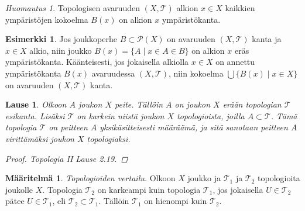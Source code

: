 \documentclass[12pt,a4paper,leqno]{report}
\newcommand{\T}{\mathcal{T}}
\newcommand{\Pot}{\mathcal{P}}
\theoremstyle{plain}
\newtheorem{lause}[equation]{Lause}
\theoremstyle{definition}
\newtheorem{maar}[equation]{Määritelmä}
\newtheorem{esim}[equation]{Esimerkki}
\theoremstyle{remark}
\newtheorem{huom}[equation]{Huomautus}
\begin{document}
\begin{huom}\label{kaikki_ystöt}
Topologisen avaruuden $(X,\T)$ alkion $x\in X$ kaikkien ympäristöjen kokoelma $B(x)$ on alkion $x$ ympäristökanta.
\end{huom}
\begin{esim}
Jos joukkoperhe $B\subset\Pot(X)$ on avaruuden $(X,\T)$ kanta ja 
$x\in X$ alkio, niin joukko 
$B(x)=\{A\mid x\in A\in B\}$ on alkion $x$ eräs ympäristökanta.
Käänteisesti, jos jokaisella alkiolla $x\in X$ on annettu ympäristökanta 
$B(x)$ avaruudessa $(X,\T)$, niin kokoelma $\bigcup\{B(x)\mid x\in X\}$ 
on avaruuden $(X,\T)$ kanta.
\end{esim}
\begin{lause}
Olkoon $A$ joukon $X$ peite. Tällöin $A$ on joukon $X$ erään topologian $\T$ esikanta. 
Lisäksi $\T$ on karkein niistä joukon $X$ topologioista, joilla $A\subset\T$. 
Tämä topologia $\T$ on peitteen $A$ yksikäsitteisesti määräämä, ja sitä sanotaan peitteen $A$ virittämäksi joukon $X$ topologiaksi.
\begin{proof}
Topologia II \cite{Topo2} Lause 2.19.
\end{proof}
\end{lause}
\begin{maar}
\emph{Topologioiden vertailu.}
Olkoon $X$ joukko ja $\T_1$ ja $\T_2$ topologioita joukolle $X$.
Topologia $\T_2$ on karkeampi kuin topologia $\T_1$, 
jos jokaisella $ U\in\T_2$ pätee $ U\in\T_1$, eli $ \T_2\subset\T_1$. 
Tällöin $\T_1$ on hienompi kuin $\T_2$.
\end{maar}
\end{document}
